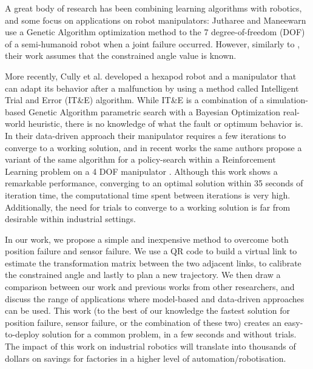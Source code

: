 \documentclass{ieeeaccess}
\begin{document}

A great body of research has been combining learning algorithms with robotics, and some focus on applications on robot manipulators: Jutharee and Maneewarn \cite{7832455} use a Genetic Algorithm optimization method to the 7 degree-of-freedom (DOF) of a semi-humanoid robot when a joint failure occurred. However, similarly to \cite{goel2005analyzing}, their work assumes that the constrained angle value is known.


More recently, Cully et al.\cite{cully2015robots} developed a hexapod robot and a manipulator that can adapt its behavior after a malfunction by using a method called Intelligent Trial and Error (IT\&E) algorithm. While IT\&E is a combination of a simulation-based Genetic Algorithm parametric search with a Bayesian Optimization real-world heuristic, there is no knowledge of what the fault or optimum behavior is. In their data-driven approach their manipulator requires a few iterations to converge to a working solution, and in recent works the same authors propose a variant of the same algorithm for a policy-search within a Reinforcement Learning problem on a 4 DOF manipulator \cite{chatzilygeroudis2017black}. Although this work shows a remarkable performance, converging to an optimal solution within 35 seconds of iteration time, the computational time spent between iterations is very high. Additionally, the need for trials to converge to a working solution is far from desirable within industrial settings.

In our work, we propose a simple and inexpensive method to overcome both position failure and sensor failure. We use a QR code to build a virtual link to estimate the transformation matrix between the two adjacent links, to calibrate the constrained angle and lastly to plan a new trajectory. We then draw a comparison between our work and previous works from other researchers, and discuss the range of applications where model-based and data-driven approaches can be used. This work (to the best of our knowledge the fastest solution for position failure, sensor failure, or the combination of these two) creates an easy-to-deploy solution for a common problem, in a few seconds and without trials. The impact of this work on industrial robotics will translate into thousands of dollars on savings for factories in a higher level of automation/robotisation.
\end{document}
